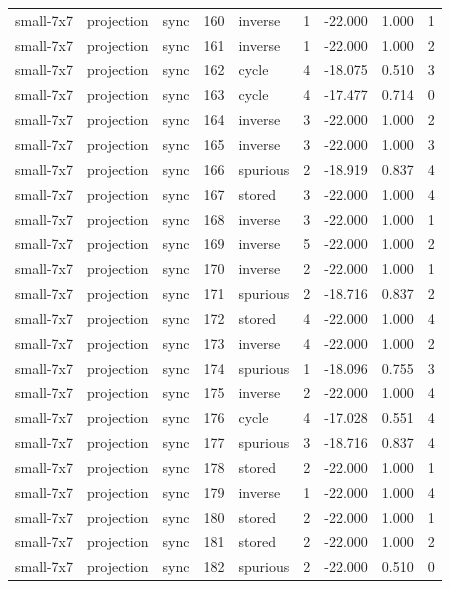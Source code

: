 \begin{tabular}{lllrlrrrr}
small-7x7 & projection & sync & 160 & inverse & 1 & -22.000 & 1.000 & 1 \\
small-7x7 & projection & sync & 161 & inverse & 1 & -22.000 & 1.000 & 2 \\
small-7x7 & projection & sync & 162 & cycle & 4 & -18.075 & 0.510 & 3 \\
small-7x7 & projection & sync & 163 & cycle & 4 & -17.477 & 0.714 & 0 \\
small-7x7 & projection & sync & 164 & inverse & 3 & -22.000 & 1.000 & 2 \\
small-7x7 & projection & sync & 165 & inverse & 3 & -22.000 & 1.000 & 3 \\
small-7x7 & projection & sync & 166 & spurious & 2 & -18.919 & 0.837 & 4 \\
small-7x7 & projection & sync & 167 & stored & 3 & -22.000 & 1.000 & 4 \\
small-7x7 & projection & sync & 168 & inverse & 3 & -22.000 & 1.000 & 1 \\
small-7x7 & projection & sync & 169 & inverse & 5 & -22.000 & 1.000 & 2 \\
small-7x7 & projection & sync & 170 & inverse & 2 & -22.000 & 1.000 & 1 \\
small-7x7 & projection & sync & 171 & spurious & 2 & -18.716 & 0.837 & 2 \\
small-7x7 & projection & sync & 172 & stored & 4 & -22.000 & 1.000 & 4 \\
small-7x7 & projection & sync & 173 & inverse & 4 & -22.000 & 1.000 & 2 \\
small-7x7 & projection & sync & 174 & spurious & 1 & -18.096 & 0.755 & 3 \\
small-7x7 & projection & sync & 175 & inverse & 2 & -22.000 & 1.000 & 4 \\
small-7x7 & projection & sync & 176 & cycle & 4 & -17.028 & 0.551 & 4 \\
small-7x7 & projection & sync & 177 & spurious & 3 & -18.716 & 0.837 & 4 \\
small-7x7 & projection & sync & 178 & stored & 2 & -22.000 & 1.000 & 1 \\
small-7x7 & projection & sync & 179 & inverse & 1 & -22.000 & 1.000 & 4 \\
small-7x7 & projection & sync & 180 & stored & 2 & -22.000 & 1.000 & 1 \\
small-7x7 & projection & sync & 181 & stored & 2 & -22.000 & 1.000 & 2 \\
small-7x7 & projection & sync & 182 & spurious & 2 & -22.000 & 0.510 & 0 \\

\end{tabular}
